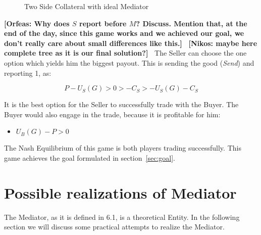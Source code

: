 \documentclass{cacthesis}
\newcommand{\authnote}[3]{{ \footnotesize \textbf{#1[#2: #3]~}}}
\newcommand{\orfnote}[1]{\authnote{\color{blue}}{Orfeas}{#1}}
\newcommand{\niknote}[1]{\authnote{\color{red}}{Nikos}{#1}}
\begin{document}
\begin{figure}[htb!]
    \centering
    \caption{Two Side Collateral with ideal Mediator}
\end{figure}

\orfnote{Why does $S$ report before $M$? Discuss. Mention that, at the end of
the day, since this game works and we achieved our goal, we don't really care
about small differences like this.}
\niknote{maybe here complete tree as it is our final solution?}
The Seller can choose the one option which yields him the biggest payout. This is sending the good (\emph{Send}) and reporting 1, as: 

\[P-U_S(G)>0>-C_S>-U_S(G) - C_S\]

It is the best option for the Seller to successfully trade with the Buyer.
The Buyer would also engage in the trade, because it is profitable for him:
\begin{itemize}
    \item $U_B(G) -P > 0$
\end{itemize}
The Nash Equilibrium of this game is both players trading successfully. This game achieves the goal formulated in section~\ref{sec:goal}.

\section{Possible realizations of Mediator}
The Mediator, as it is defined in 6.1, is a theoretical Entity. In the following section we will discuss some practical attempts to realize the Mediator.
\end{document}
